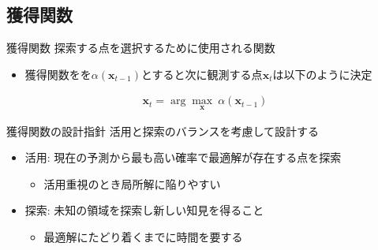 \documentclass[dvipdfmx, 10.5pt]{beamer}
\begin{document}
\subsection{獲得関数}
\begin{frame}{\insertsubsection}
	\begin{block}{獲得関数}
		探索する点を選択するために使用される関数 %
	\end{block}
	\begin{itemize}
		\item 獲得関数をを$\alpha(\bm x_{t-1})$とすると次に観測する点$\bm x_t$は以下のように決定
	\end{itemize}
	\begin{align*}
		\bm x_t = \arg \max_{\bm x} ~ \alpha(\bm x_{t-1})
	\end{align*}
	\begin{block}{獲得関数の設計指針}
		活用と探索のバランスを考慮して設計する
	\end{block}
	\begin{itemize}
		\item 活用: 現在の予測から最も高い確率で最適解が存在する点を探索
		\begin{itemize}
			\item 活用重視のとき局所解に陥りやすい
		\end{itemize}
		\item 探索: 未知の領域を探索し新しい知見を得ること
		\begin{itemize}
			\item 最適解にたどり着くまでに時間を要する
		\end{itemize}
	\end{itemize}

\end{frame}

\end{document}
